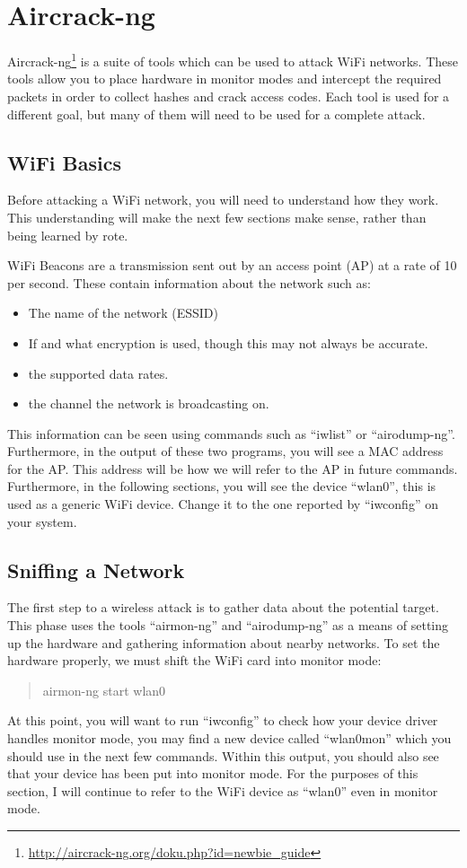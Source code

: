 \documentclass[a4paper,11pt]{report}
\begin{document}
	\section{Aircrack-ng}
		Aircrack-ng\footnote{\url{http://aircrack-ng.org/doku.php?id=newbie\_guide}} is a suite of tools which can be used to attack WiFi networks. 
		These tools allow you to place hardware in monitor modes and intercept the required packets in order to collect hashes and crack access codes. 
		Each tool is used for a different goal, but many of them will need to be used for a complete attack. 
		\subsection{WiFi Basics}
			Before attacking a WiFi network, you will need to understand how they work. 
			This understanding will make the next few sections make sense, rather than being learned by rote.

			WiFi Beacons are a transmission sent out by an access point (AP) at a rate of 10 per second. 
			These contain information about the network such as:
			\begin{itemize}
				\item The name of the network (ESSID)
				\item If and what encryption is used, though this may not always be accurate. 
				\item the supported data rates. 
				\item the channel the network is broadcasting on. 
			\end{itemize}
			This information can be seen using commands such as ``iwlist'' or ``airodump-ng''.
			Furthermore, in the output of these two programs, you will see a MAC address for the AP. 
			This address will be how we will refer to the AP in future commands. 
			Furthermore, in the following sections, you will see the device ``wlan0'', this is used as a generic WiFi device. 
			Change it to the one reported by ``iwconfig'' on your system. 
		\subsection{Sniffing a Network}
			The first step to a wireless attack is to gather data about the potential target. 
			This phase uses the tools ``airmon-ng'' and ``airodump-ng'' as a means of setting up the hardware and gathering information about nearby networks. 
			To set the hardware properly, we must shift the WiFi card into monitor mode:
			\begin{quote}
				airmon-ng start wlan0
			\end{quote}
			At this point, you will want to run ``iwconfig'' to check how your device driver handles monitor mode, you may find a new device called ``wlan0mon'' which you should use in the next few commands. 
			Within this output, you should also see that your device has been put into monitor mode. 
			For the purposes of this section, I will continue to refer to the WiFi device as ``wlan0'' even in monitor mode. 
\end{document}
